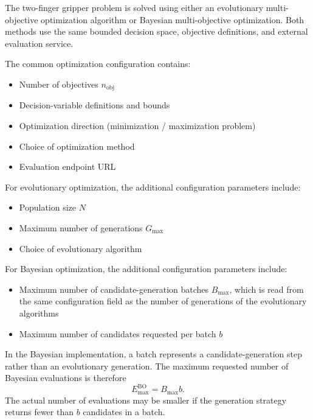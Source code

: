 The two-finger gripper problem is solved using either an evolutionary multi-objective optimization
algorithm or Bayesian multi-objective optimization. Both methods use the same bounded decision
space, objective definitions, and external evaluation service.

The common optimization configuration contains:
\begin{itemize}
    \item Number of objectives $n_{\text{obj}}$
    \item Decision-variable definitions and bounds
    \item Optimization direction (minimization / maximization problem)
    \item Choice of optimization method
    \item Evaluation endpoint URL
\end{itemize}

For evolutionary optimization, the additional configuration parameters include:
\begin{itemize}
    \item Population size $N$
    \item Maximum number of generations $G_{\max}$
    \item Choice of evolutionary algorithm
\end{itemize}

For Bayesian optimization, the additional configuration parameters include:
\begin{itemize}
    \item Maximum number of candidate-generation batches $B_{\max}$, which is read from the same
          configuration field as the number of generations of the evolutionary algorithms
    \item Maximum number of candidates requested per batch $b$
\end{itemize}

In the Bayesian implementation, a batch represents a candidate-generation step rather than an
evolutionary generation. The maximum requested number of Bayesian evaluations is therefore
\begin{equation}
    E_{\max}^{\mathrm{BO}} = B_{\max}b.
\end{equation}
The actual number of evaluations may be smaller if the generation strategy returns fewer than $b$
candidates in a batch. 


